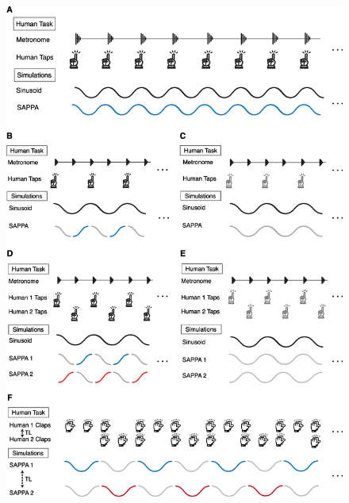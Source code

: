 \documentclass{report}
\begin{document}
\begin{figure}[!h]
    \centering
    \includegraphics{figures/fig2_1.png}
    \label{f2_1}
\end{figure}
\end{document}
